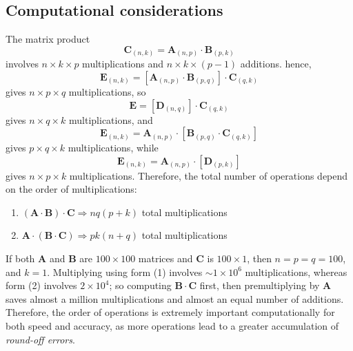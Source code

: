 \subsection{Computational considerations}
The matrix product
\begin{equation}
\mathbf{C}_{(n,k)} = \mathbf{A}_{(n,p)} \cdot \mathbf{B}_{(p,k)}
\end{equation}
involves $n \times k \times p$ multiplications and $n \times k  \times (p -1)$ additions.  hence,
\begin{equation}
\mathbf{E}_{(n,k)} = [ \mathbf{A}_{(n,p)} \cdot \mathbf{B}_{(p,q)}] \cdot \mathbf{C}_{(q,k)}
\end{equation}	 
gives $n \times p \times q$ multiplications, so
\begin{equation}
\mathbf{E} = [\mathbf{D}_{(n,q)}] \cdot \mathbf{C}_{(q,k)}
\end{equation}
gives $n\times q \times k$ multiplications, and
\begin{equation}
\mathbf{E} _{(n,k)} = \mathbf{A}_{(n,p)} \cdot [\mathbf{B}_{(p,q)} \cdot \mathbf{C}_{(q,k)}]
\end{equation}
gives $p\times q \times k$ multiplications, while
\begin{equation}
\mathbf{E}_{(n,k)} = \mathbf{A}_{(n,p)}\cdot [\mathbf{D}_{(p,k)} ]
\end{equation}	
gives $n \times p \times k$ multiplications. Therefore, the total number of operations depend on the order of multiplications:
\begin{enumerate}
\item $\mathbf{(A \cdot B) \cdot C} \Rightarrow nq(p+k)$ total multiplications
\item $\mathbf{A \cdot (B \cdot C)} \Rightarrow pk(n+q)$ total multiplications
\end{enumerate}
If both $\mathbf{A}$ and $\mathbf{B}$ are $100 \times 100$ matrices and $\mathbf{C}$ is $100 \times 1$, then $n = p = q = 100$, and $k 
= 1$. Multiplying using form (1) involves $\sim 1 \times 10^6$ multiplications, whereas form (2) involves $2 \times 
10^4$; so computing $\mathbf{B \cdot C}$ first, then premultiplying by $\mathbf{A}$ saves almost a million multiplications 
and almost an equal number of additions. Therefore, the order of operations is extremely important 
computationally for both speed and accuracy, as more operations lead to a greater accumulation of 
\emph{round-off errors}.


